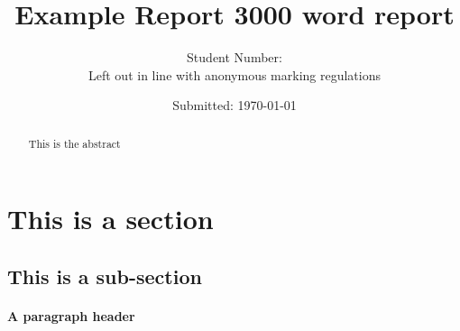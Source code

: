 \documentclass[a4paper,11pt]{article}
\begin{document}
%
   \title{Example Report \vfill
   \vfill 3000 word report}
   \author{Student Number:  \\ Left out in line with anonymous marking regulations}
   \date{Submitted: \today}

   \maketitle
   \newpage
   \tableofcontents
 
  \newpage


\begin{abstract}
 This is the abstract
\end{abstract}
\section{This is a section}
\blindtext
\subsection{This is a sub-section}
\paragraph{A paragraph header}

\newpage
\listoftables

\newpage
\listoffigures

\newpage
% 
% 
\end{document}
